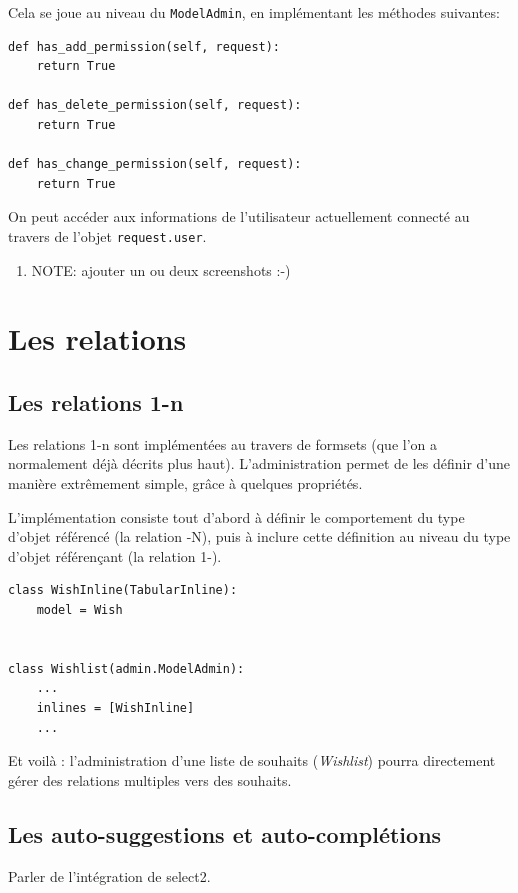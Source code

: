 \documentclass[11pt]{amsbook}
\begin{document}
Cela se joue au niveau du \texttt{ModelAdmin}, en implémentant les méthodes suivantes:


\begin{verbatim}
def has_add_permission(self, request):
	return True

def has_delete_permission(self, request):
	return True

def has_change_permission(self, request):
	return True
\end{verbatim}

On peut accéder aux informations de l’utilisateur actuellement connecté au travers de l’objet \texttt{request.user}.


\begin{enumerate}

\item{NOTE: ajouter un ou deux screenshots :-)}

\end{enumerate}


\hypertarget{x-les-relations}{\section{Les relations}}
\hypertarget{x-les-relations-1-n}{\subsection{Les relations 1-n}}
Les relations 1-n sont implémentées au travers de formsets (que l’on a normalement déjà décrits plus haut). L’administration permet de les définir d’une manière extrêmement simple, grâce à quelques propriétés.


L’implémentation consiste tout d’abord à définir le comportement du type d’objet référencé (la relation -N), puis à inclure cette définition au niveau du type d’objet référençant (la relation 1-).


\begin{verbatim}
class WishInline(TabularInline):
	model = Wish


class Wishlist(admin.ModelAdmin):
	...
	inlines = [WishInline]
	...
\end{verbatim}

Et voilà : l’administration d’une liste de souhaits (\emph{Wishlist}) pourra directement gérer des relations multiples vers des souhaits.


\hypertarget{x-les-auto-suggestions-et-auto-complétions}{\subsection{Les auto-suggestions et auto-complétions}}
Parler de l’intégration de select2.
\end{document}
